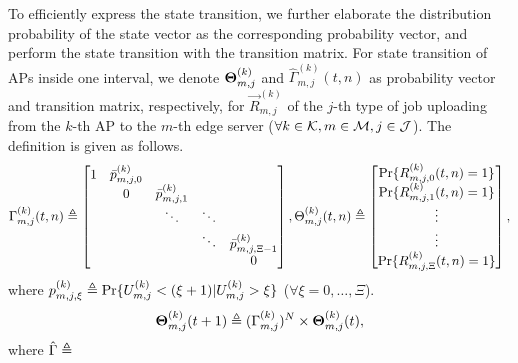 To efficiently express the state transition, we further elaborate the distribution probability of the state vector as the corresponding probability vector, and perform the state transition with the transition matrix.
For state transition of APs inside one interval, we denote $\boldsymbol{\Theta}^{(k)}_{m,j}$ and $\hat{\Gamma}^{(k)}_{m,j}(t,n)$ as probability vector and transition matrix, respectively, for $\vec{R}^{(k)}_{m,j}$ of the $j$-th type of job uploading from the $k$-th AP to the $m$-th edge server ($\forall k\in\mathcal{K}, m\in\mathcal{M}, j\in\mathcal{J}$). The definition is given as follows.
\begin{align}
    \Gamma^{(k)}_{m,j}(t,n) \triangleq
    \begin{bmatrix}
        1 & \bar{p}^{(k)}_{m,j,0} &                       &        &                           \\
          & 0                     & \bar{p}^{(k)}_{m,j,1} &        &                           \\
          &                       & \ddots                & \ddots &                           \\
          &                       &                       & \ddots & \bar{p}^{(k)}_{m,j,\Xi-1} \\
          &                       &                       &        & 0                         \\
    \end{bmatrix},
    \Theta^{(k)}_{m,j}(t,n) \triangleq
    \begin{bmatrix}
        \Pr\{R^{(k)}_{m,j,0}(t,n) = 1\} \\
        \Pr\{R^{(k)}_{m,j,1}(t,n) = 1\} \\
        \vdots \\
        \vdots \\
        \Pr\{R^{(k)}_{m,j,\Xi}(t,n) = 1\}
    \end{bmatrix},
\end{align}
where $p^{(k)}_{m,j,\xi} \triangleq \Pr\{U^{(k)}_{m,j} < (\xi+1) | U^{(k)}_{m,j}>\xi\}$ ($\forall \xi=0,\dots,\Xi$).
\begin{align}
    \boldsymbol{\Theta}^{(k)}_{m,j}({t+1}) \triangleq ( \Gamma^{(k)}_{m,j} )^{N} \times \boldsymbol{\Theta}^{(k)}_{m,j}({t}),
\end{align}
where $\hat{\Gamma} \triangleq $


